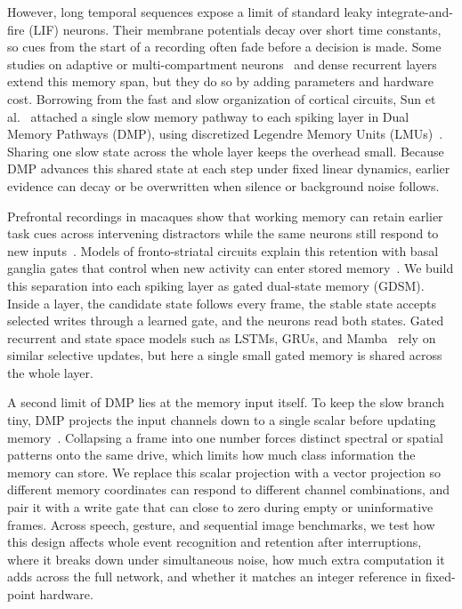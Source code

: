 \documentclass[10pt,twocolumn]{article}
\begin{document}
However, long temporal sequences expose a limit of standard leaky integrate-and-fire (LIF) neurons. Their membrane potentials decay over short time constants, so cues from the start of a recording often fade before a decision is made. Some studies on adaptive or multi-compartment neurons~\cite{yin2021,glif,tclif} and dense recurrent layers extend this memory span, but they do so by adding parameters and hardware cost. Borrowing from the fast and slow organization of cortical circuits, Sun et al.~\cite{dmp} attached a single slow memory pathway to each spiking layer in Dual Memory Pathways (DMP), using discretized Legendre Memory Units (LMUs)~\cite{lmu,hippo}. Sharing one slow state across the whole layer keeps the overhead small. Because DMP advances this shared state at each step under fixed linear dynamics, earlier evidence can decay or be overwritten when silence or background noise follows.

Prefrontal recordings in macaques show that working memory can retain earlier task cues across intervening distractors while the same neurons still respond to new inputs~\cite{miller1996,millercohen}. Models of fronto-striatal circuits explain this retention with basal ganglia gates that control when new activity can enter stored memory~\cite{frank2001,oreillyfrank,chatham2015}. We build this separation into each spiking layer as gated dual-state memory (GDSM). Inside a layer, the candidate state follows every frame, the stable state accepts selected writes through a learned gate, and the neurons read both states. Gated recurrent and state space models such as LSTMs, GRUs, and Mamba~\cite{lstm,gru,mamba} rely on similar selective updates, but here a single small gated memory is shared across the whole layer.

A second limit of DMP lies at the memory input itself. To keep the slow branch tiny, DMP projects the input channels down to a single scalar before updating memory~\cite{dmp}. Collapsing a frame into one number forces distinct spectral or spatial patterns onto the same drive, which limits how much class information the memory can store. We replace this scalar projection with a vector projection so different memory coordinates can respond to different channel combinations, and pair it with a write gate that can close to zero during empty or uninformative frames. Across speech, gesture, and sequential image benchmarks, we test how this design affects whole event recognition and retention after interruptions, where it breaks down under simultaneous noise, how much extra computation it adds across the full network, and whether it matches an integer reference in fixed-point hardware.
\end{document}
